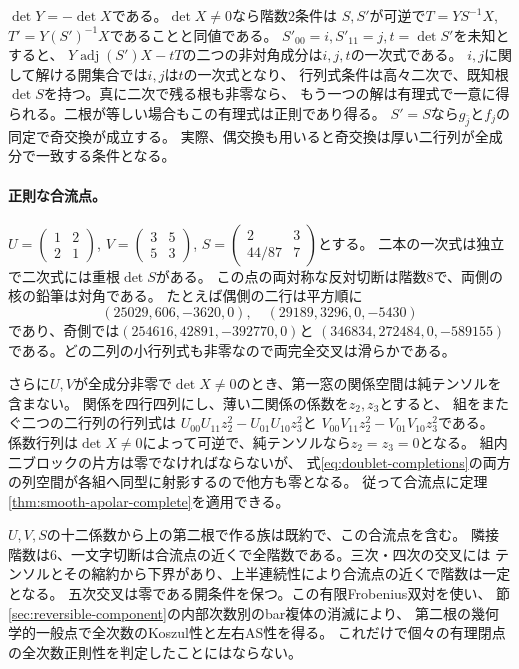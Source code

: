 $\det Y=-\det X$である。$\det X\ne0$なら階数2条件は
$S,S'$が可逆で$T=YS^{-1}X$, $T'=Y(S')^{-1}X$であることと同値である。
$S'_{00}=i,S'_{11}=j,t=\det S'$を未知とすると、
$Y\operatorname{adj}(S')X-tT$の二つの非対角成分は$i,j,t$の一次式である。
$i,j$に関して解ける開集合では$i,j$は$t$の一次式となり、
行列式条件は高々二次で、既知根$\det S$を持つ。真に二次で残る根も非零なら、
もう一つの解は有理式で一意に得られる。二根が等しい場合もこの有理式は正則であり得る。
$S'=S$なら$g_{\bar j}$と$f_j$の同定で奇交換が成立する。
実際、偶交換も用いると奇交換は厚い二行列が全成分で一致する条件となる。

\paragraph{正則な合流点。}
$U=\left(\begin{smallmatrix}1&2\\2&1\end{smallmatrix}\right)$,
$V=\left(\begin{smallmatrix}3&5\\5&3\end{smallmatrix}\right)$,
$S=\left(\begin{smallmatrix}2&3\\44/87&7\end{smallmatrix}\right)$とする。
二本の一次式は独立で二次式には重根$\det S$がある。
この点の両対称な反対切断は階数8で、両側の核の鉛筆は対角である。
たとえば偶側の二行は平方順に
\[
 (25029,606,-3620,0),\quad (29189,3296,0,-5430)
\]
であり、奇側では$(254616,42891,-392770,0)$と
$(346834,272484,0,-589155)$である。どの二列の小行列式も非零なので両完全交叉は滑らかである。

さらに$U,V$が全成分非零で$\det X\ne0$のとき、第一窓の関係空間は純テンソルを含まない。
関係を四行四列にし、薄い二関係の係数を$z_2,z_3$とすると、
組をまたぐ二つの二行列の行列式は
$U_{00}U_{11}z_2^2-U_{01}U_{10}z_3^2$と
$V_{00}V_{11}z_2^2-V_{01}V_{10}z_3^2$である。
係数行列は$\det X\ne0$によって可逆で、純テンソルなら$z_2=z_3=0$となる。
組内二ブロックの片方は零でなければならないが、
式\eqref{eq:doublet-completions}の両方の列空間が各組へ同型に射影するので他方も零となる。
従って合流点に定理\ref{thm:smooth-apolar-complete}を適用できる。

$U,V,S$の十二係数から上の第二根で作る族は既約で、この合流点を含む。
隣接階数は6、一文字切断は合流点の近くで全階数である。三次・四次の交叉には
テンソルとその縮約から下界があり、上半連続性により合流点の近くで階数は一定となる。
五次交叉は零である開条件を保つ。この有限Frobenius双対を使い、
節\ref{sec:reversible-component}の内部次数別のbar複体の消滅により、
第二根の幾何学的一般点で全次数のKoszul性と左右AS性を得る。
これだけで個々の有理閉点の全次数正則性を判定したことにはならない。

